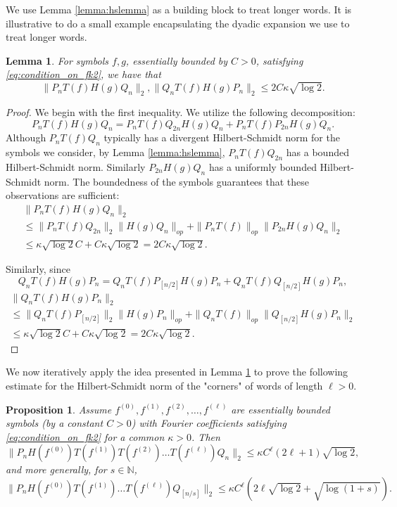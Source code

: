 \documentclass[11pt]{amsart}
\theoremstyle{plain}
\newtheorem{lemma}[theorem]{Lemma}
\newtheorem{proposition}[theorem]{Proposition}
\theoremstyle{remark}
\numberwithin{equation}{section}
\begin{document}
We use Lemma \ref{lemma:hslemma} as a building block to treat longer words. It is illustrative to do a small example encapsulating the dyadic expansion we use to treat longer words.
%
\begin{lemma}\label{lemma:dyadic_example}
For symbols $f,g$, essentially bounded by $C>0$, satisfying \eqref{eq:condition_on_fk2}, we have that
\begin{equation}
\|P_nT(f)H(g)Q_n\|_2, \|Q_nT(f)H(g)P_n\|_2\leq 2C\kappa\sqrt{\log 2}.
\end{equation}

\end{lemma}
\begin{proof}
We begin with the first inequality. We utilize the following decomposition:
$$P_nT(f)H(g)Q_n=P_nT(f)Q_{2n}H(g)Q_n+P_nT(f)P_{2n}H(g)Q_n.$$
Although $P_nT(f)Q_n$ typically has a divergent Hilbert-Schmidt norm for the symbols we consider, by Lemma \ref{lemma:hslemma},  $P_nT(f)Q_{2n}$ has a bounded Hilbert-Schmidt norm. Similarly $P_{2n} H(g)Q_n$ has a uniformly bounded Hilbert-Schmidt norm. The boundedness of the symbols guarantees that these observations are sufficient:
\begin{multline}
\|P_nT(f)H(g)Q_n\|_2
\\
\leq 
\|P_nT(f)Q_{2n}\|_2\|H(g)Q_n\|_{op}+\|P_nT(f)\|_{op}\|P_{2n}H(g)Q_n\|_2
\\\leq \kappa\sqrt{\log 2}C+C\kappa\sqrt{\log 2}=2C\kappa\sqrt{\log 2}.
\end{multline}

Similarly, since
$$Q_nT(f)H(g)P_n
=
Q_nT(f)P_{[n/2]}H(g)P_n
+ Q_nT(f)Q_{[n/2]}H(g)P_n,$$
\begin{multline}
\|Q_nT(f)H(g)P_n\|_2
\\
\leq \|Q_nT(f)P_{[n/2]}\|_2\|H(g)P_n\|_{op}
+ \|Q_nT(f)\|_{op}\|Q_{[n/2]}H(g)P_n\|_2
\\
\leq 
\kappa\sqrt{\log 2} C+ C\kappa\sqrt{\log 2}=2C\kappa\sqrt{\log 2}.
\end{multline}
\end{proof}
%

We now iteratively apply the idea presented in Lemma \ref{lemma:dyadic_example} to prove the following estimate for the Hilbert-Schmidt norm of the "corners" of words of length $\ell>0$.
\begin{proposition}\label{prop:one_side}
Assume
$f^{(0)},f^{(1)}, f^{(2)}, \ldots, f^{(\ell)}$ are essentially bounded symbols (by a constant $C>0$) with Fourier coefficients 
satisfying \eqref{eq:condition_on_fk2} for a common $\kappa>0$. Then
%
$$\|P_n H(f^{(0)}) T(f^{(1)}) T(f^{(2)})\ldots T(f^{(\ell)})Q_n\|_2\leq \kappa C^{\ell}(2\ell+1)\sqrt{\log 2},$$
and more generally, for $s\in\mathbb{N}$,
\begin{equation}\label{eqn:pq_general}
\|P_n H(f^{(0)}) T(f^{(1)})\ldots T(f^{(\ell)})Q_{[n/s]}\|_2
\leq \kappa C^{\ell}\left(2\ell \sqrt{\log 2}+ \sqrt{\log(1+s)}\right).  
\end{equation}
\end{proposition}
\end{document}
